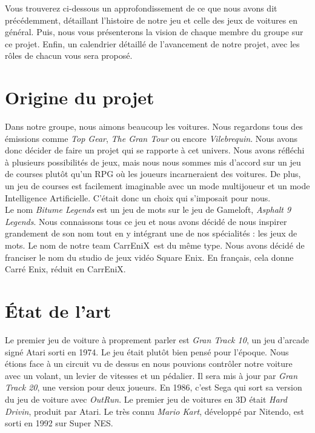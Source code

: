 \documentclass[11pt,a4paper]{article}
\newcommand{\CEX}{CarrEniX}
\begin{document}
  Vous trouverez ci-dessous un approfondissement de ce que nous avons dit précédemment, détaillant l'histoire de notre jeu 
  et celle des jeux de voitures
  en général. Puis, nous vous présenterons la vision de chaque membre du groupe sur ce projet. Enfin, un calendrier 
  détaillé de l'avancement de notre projet, avec les rôles de chacun vous sera proposé.
  
\clearpage

\section{Origine du projet}
  Dans notre groupe, nous aimons beaucoup les voitures. Nous regardons tous des émissions comme 
  \textit{Top Gear}, \textit{The Gran Tour} ou encore \textit{Vilebrequin}. Nous avons donc décider de faire
  un projet qui se rapporte à cet univers. Nous avons réfléchi à plusieurs possibilités de jeux, mais nous
  nous sommes mis d'accord sur un jeu de courses plutôt qu'un RPG où les joueurs incarneraient des voitures.
  De plus, un jeu de courses est facilement imaginable avec un mode multijoueur et un mode Intelligence 
  Artificielle. C'était donc un choix qui s'imposait pour nous.\\

  \indent Le nom \textit{Bitume Legends} est un jeu de mots sur le jeu de Gameloft, \textit{Asphalt 9 Legends}.
  Nous connaissons tous ce jeu et nous avons décidé de nous inspirer grandement de son nom tout en y intégrant
  une de nos spécialités : les jeux de mots. Le nom de notre team \CEX\, est du même type. Nous avons décidé
  de franciser le nom du studio de jeux vidéo Square Enix. En français, cela donne Carré Enix, réduit en
  \CEX.\\

\section{État de l'art}
  Le premier jeu de voiture à proprement parler est \textit{Gran Track 10}, un jeu d'arcade signé Atari 
  sorti en 1974. Le jeu était plutôt bien pensé pour l'époque. Nous étions face à un 
  circuit vu de dessus en nous pouvions contrôler notre voiture avec un volant, un levier de vitesses
  et un pédalier. Il sera mis à jour par \textit{Gran Track 20}, une version pour deux joueurs.
  En 1986, c'est Sega qui sort sa version du jeu de voiture avec \textit{OutRun}. Le premier 
  jeu de voitures en 3D était \textit{Hard Drivin}, produit par Atari. Le très connu \textit{Mario Kart},
  développé par Nitendo, est sorti en 1992 sur Super NES.\\
\end{document}
